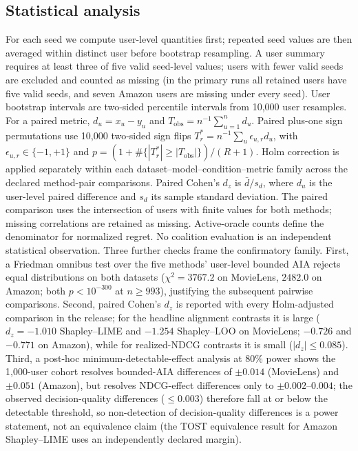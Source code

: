 \documentclass[a4paper,fleqn,doubleblind]{cas-sc}
\begin{document}
\subsection{Statistical analysis}
For each seed we compute user-level quantities first; repeated seed values are then averaged within distinct user before bootstrap resampling. A user summary requires at least three of five valid seed-level values; users with fewer valid seeds are excluded and counted as missing (in the primary runs all retained users have five valid seeds, and seven Amazon users are missing under every seed). User bootstrap intervals are two-sided percentile intervals from 10,000 user resamples. For a paired metric, $d_u=x_u-y_u$ and $T_{\mathrm{obs}}=n^{-1}\sum_{u=1}^{n}d_u$. Paired plus-one sign permutations use 10,000 two-sided sign flips $T_r^*=n^{-1}\sum_u\epsilon_{u,r}d_u$, with $\epsilon_{u,r}\in\{-1,+1\}$ and $p=(1+\#\{|T_r^*|\ge|T_{\mathrm{obs}}|\})/(R+1)$. Holm correction is applied separately within each dataset--model--condition--metric family across the declared method-pair comparisons. Paired Cohen's $d_z$ is $\bar d/s_d$, where $d_u$ is the user-level paired difference and $s_d$ its sample standard deviation. The paired comparison uses the intersection of users with finite values for both methods; missing correlations are retained as missing. Active-oracle counts define the denominator for normalized regret. No coalition evaluation is an independent statistical observation.
Three further checks frame the confirmatory family. First, a Friedman omnibus test over the five methods' user-level bounded AIA rejects equal distributions on both datasets ($\chi^2=3767.2$ on MovieLens, $2482.0$ on Amazon; both $p<10^{-300}$ at $n\ge993$), justifying the subsequent pairwise comparisons. Second, paired Cohen's $d_z$ is reported with every Holm-adjusted comparison in the release; for the headline alignment contrasts it is large ($d_z=-1.010$ Shapley--LIME and $-1.254$ Shapley--LOO on MovieLens; $-0.726$ and $-0.771$ on Amazon), while for realized-NDCG contrasts it is small ($|d_z|\le0.085$). Third, a post-hoc minimum-detectable-effect analysis at 80\% power shows the 1,000-user cohort resolves bounded-AIA differences of $\pm0.014$ (MovieLens) and $\pm0.051$ (Amazon), but resolves NDCG-effect differences only to $\pm0.002$--$0.004$; the observed decision-quality differences ($\le0.003$) therefore fall at or below the detectable threshold, so non-detection of decision-quality differences is a power statement, not an equivalence claim (the TOST equivalence result for Amazon Shapley--LIME uses an independently declared margin).
\end{document}

